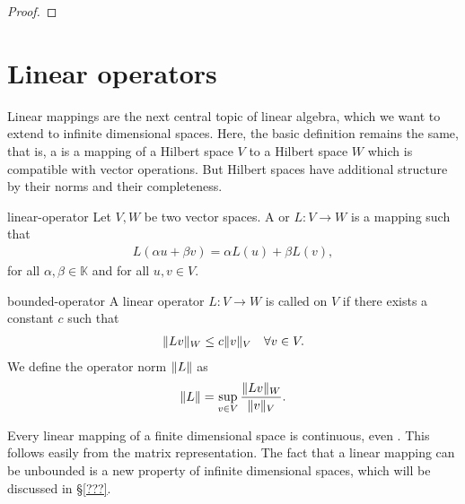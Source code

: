\begin{todo}
\begin{proof}
    
\end{proof}
\end{todo}
\section{Linear operators}

\begin{intro}
  Linear mappings are the next central topic of linear algebra, which
  we want to extend to infinite dimensional spaces. Here, the basic
  definition remains the same, that is, a  is
  a mapping of a Hilbert space $V$ to a Hilbert space $W$ which is
  compatible with vector operations. But Hilbert spaces have
  additional structure by their norms and their completeness.
\end{intro}

\begin{Definition}{linear-operator}
  Let $V,W$ be two vector spaces. A  or
   $L\colon V\to W$ is a mapping such that
  \begin{gather*}
    L(\alpha u+\beta v) = \alpha L(u) + \beta L(v),
  \end{gather*}
  for all $\alpha,\beta\in\mathbb K$ and for all $u,v\in V$.
\end{Definition}

\begin{Definition}{bounded-operator}
  A linear operator $L\colon V\to W$ is called  on $V$
  if there exists a constant $c$ such that
  \begin{gather}
    \label{eq:lafa:11}
    \lVert L v\rVert_W \le c \lVert v\rVert_V
    \quad\forall v\in V.
  \end{gather}
  We define the operator norm $\lVert L\rVert$ as
  \begin{gather}
    \label{eq:lafa:12}
    \lVert L\rVert = \sup_{v\in V} \frac{\lVert L v\rVert_W}{\lVert v\rVert_V}.
  \end{gather}
\end{Definition}

\begin{remark}
  Every linear mapping of a finite dimensional space is continuous,
  even . This follows easily from the
  matrix representation. The fact that a linear mapping can be
  unbounded is a new property of infinite dimensional spaces, which
  will be discussed in §\ref{???}.
\end{remark}

